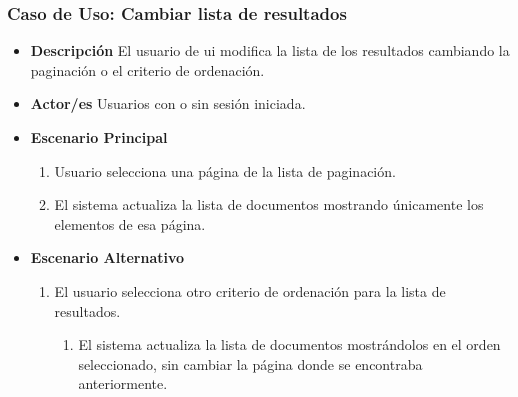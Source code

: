 \subsubsection{Caso de Uso: Cambiar lista de resultados}
\begin{itemize}
	\item{\textbf{Descripción}} El usuario de \gls{ui} modifica la lista de los resultados cambiando la paginación o el criterio de ordenación.
    \item{\textbf{Actor/es}} Usuarios con o sin sesión iniciada.
    \item{\textbf{Escenario Principal}}
    	\begin{enumerate}
        	\item Usuario selecciona una página de la lista de paginación.
			\item El sistema actualiza la lista de documentos mostrando únicamente los elementos de esa página.
        \end{enumerate}
    \item{\textbf{Escenario Alternativo}}
    	\begin{enumerate}[label=2.\alph*]
    		\item El usuario selecciona otro criterio de ordenación para la lista de resultados.
            \begin{enumerate}[label=\arabic*]
            	\item El sistema actualiza la lista de documentos mostrándolos en el orden seleccionado, sin cambiar la página donde se encontraba anteriormente.
            \end{enumerate}
        \end{enumerate}
\end{itemize}


